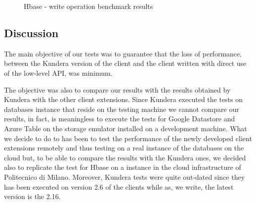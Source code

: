 \begin{figure}[tbh]
  \centering
  \caption{Hbase - write operation benchmark results}
  \label{fig:hbase-test-write}
\end{figure} 

\subsection{Discussion}
The main objective of our tests was to guarantee that the loss of performance, between the Kundera version of the client and the client written with direct use of the low-level API, was minimum.

\noindent The objective was also to compare our results with the results obtained by Kundera with the other client extensions. Since Kundera executed the tests on databases instance that reside on the testing machine we cannot compare our results, in fact, is meaningless to execute the tests for Google Datastore and Azure Table on the storage emulator installed on a development machine. What we decide to do to has been to test the performance of the newly developed client extensions remotely and thus testing on a real instance of the databases on the cloud but, to be able to compare the results with the Kundera ones, we decided also to replicate the test for Hbase on a instance in the cloud infrastructure of Politecnico di Milano.
Moreover, Kundera tests were quite out-dated since they has been executed on version 2.6 of the clients while as, we write, the latest version is the 2.16.

